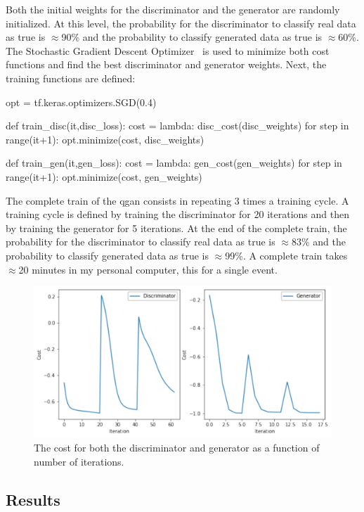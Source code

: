 Both the initial weights for the discriminator and the generator are randomly
initialized. At this level, the probability for the discriminator to classify 
real data as true is $\approx$90\% and the probability to classify generated 
data as true is $\approx$60\%. 
The Stochastic Gradient Descent Optimizer~\cite{SGC} is used to minimize both 
cost functions and find the best discriminator and generator weights. Next,
the training functions are defined:
\begin{python}
opt = tf.keras.optimizers.SGD(0.4)

def train_disc(it,disc_loss):
    cost = lambda: disc_cost(disc_weights)
    for step in range(it+1):
        opt.minimize(cost, disc_weights) 

def train_gen(it,gen_loss):
    cost = lambda: gen_cost(gen_weights)
    for step in range(it+1):
        opt.minimize(cost, gen_weights)
\end{python}

The complete train of the \gls{qgan} consists in repeating 3 times a training 
cycle. A training cycle is defined by training the discriminator for 20 
iterations and then by training the generator for 5 iterations.
At the end of the complete train, the probability for the discriminator to 
classify real data as true is $\approx$83\% and the probability to classify 
generated data as true is $\approx$99\%. A complete train takes $\approx$20 
minutes in my personal computer, this for a single event.

\begin{figure}[!htbp]
\centering
    \includegraphics[width=1\textwidth]{figures/costs.pdf}
\caption{The cost for both the discriminator and generator as a function of 
        number of iterations.}
\label{fig:costs}
\end{figure}

\subsection{Results}
\label{sec:res}

